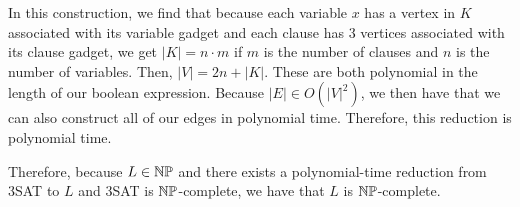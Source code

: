 \documentclass[11pt, reqno]{amsart}
\theoremstyle{plain}
\theoremstyle{definition}
\newcounter{r}
\begin{document}
\begin{enumerate}
    In this construction, we find that because each variable $x$ has a vertex
    in $K$ associated with its variable gadget and each clause has $3$ vertices
    associated with its clause gadget, we get $|K| = n\cdot m$ if $m$ is the
    number of clauses and $n$ is the number of variables. Then, $|V| = 2n +
    |K|$. These are both polynomial in the length of our boolean expression.
    Because $|E| \in O(|V|^2)$, we then have that we can also construct all of
    our edges in polynomial time. Therefore, this reduction is polynomial time.

    Therefore, because $L\in \mathbb{N}\mathbb{P}$ and there exists a polynomial-time
    reduction from 3SAT to $L$ and 3SAT is $\mathbb{N}\mathbb{P}$-complete, we have that $L$
    is $\mathbb{N}\mathbb{P}$-complete.
\end{enumerate}
\end{document}
